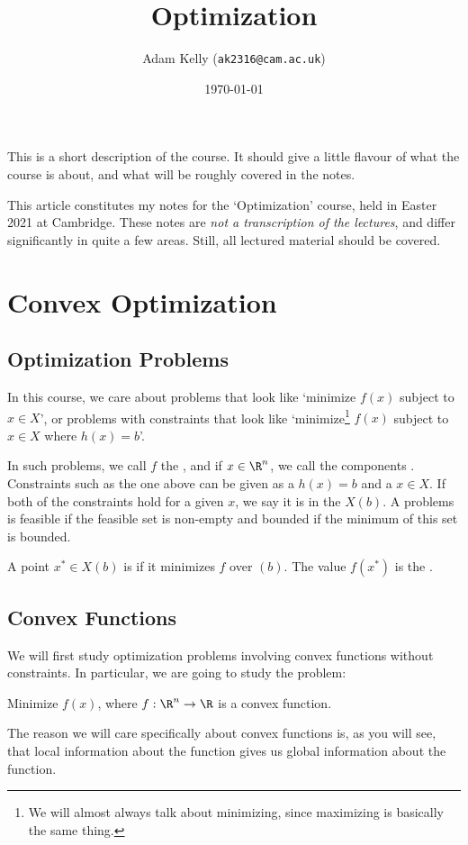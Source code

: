 \documentclass[a4paper]{scrartcl}
\title{Optimization}
\author{Adam Kelly (\texttt{ak2316@cam.ac.uk})}
\date{\today}
\begin{document}
\maketitle

This is a short description of the course. It should give a little flavour of what the course is about, and what will be roughly covered in the notes.

This article constitutes my notes for the `Optimization' course, held in Easter 2021 at Cambridge. These notes are \emph{not a transcription of the lectures}, and differ significantly in quite a few areas. Still, all lectured material should be covered.


\section{Convex Optimization}

\subsection{Optimization Problems}

In this course, we care about problems that look like `minimize $f(x)$ subject to $x \in X$', or problems with constraints that look like `minimize\footnote{We will almost always talk about minimizing, since maximizing is basically the same thing.} $f(x)$ subject to $x \in X$ where $h(x) = b$'.

In such problems, we call $f$ the , and if $x \in \R^n$, we call the components . Constraints such as the one above can be given as a  $h(x) = b$ and a  $x \in X$. If both of the constraints hold for a given $x$, we say it is in the  $X(b)$. A problems is feasible if the feasible set is non-empty and bounded if the minimum of this set is bounded.

A point $x^* \in X(b)$ is  if it minimizes $f$ over $(b)$. The value $f(x^*)$ is the .

\subsection{Convex Functions}

We will first study optimization problems involving convex functions without constraints. In particular, we are going to study the problem:
\begin{center}
    Minimize $f(x)$, where $f : \R^n \rightarrow \R$ is a convex function.
\end{center}
The reason we will care specifically about convex functions is, as you will see, that local information about the function gives us global information about the function.
\end{document}
